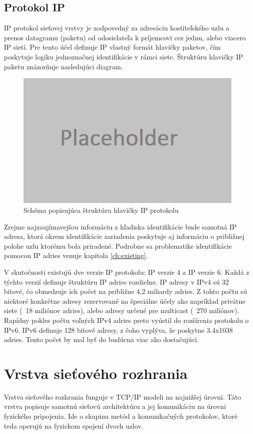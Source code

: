 \documentclass[
  printed, %
  table,   %
  lof,     %
  lot,     %
]{fithesis3}
\begin{document}
\subsection{Protokol IP}
IP protokol sieťovej vrstvy je zodpovedný za adresáciu hostiteľského uzlu a
prenos datagramu (paketu) od odosielateľa k príjemcovi cez jednu, alebo viacero
IP sietí. Pre tento účel definuje IP vlastný formát hlavičky paketov, čím
poskytuje logiku jednoznačnej identifikácie v rámci siete. Štruktúru hlavičky
IP paketu znázorňuje nasledujúci diagram.

\begin{figure}[h]
  \centering
    \includegraphics[width=.80\textwidth]{images/net-ip-head.png}
  \caption{Schéma popisujúca štruktúru hlavičky IP protokolu}
  \label{fig:net-ip-head}
\end{figure}

Zrejme najzaujímavejšou informáciu z hľadiska identifikácie bude samotná IP
adresa, ktorá okrem identifikácie zariadenia poskytuje aj informáciu o
približnej polohe uzlu ktorému bola priradené. Podrobne sa problematike
identifikácie pomocou IP adries venuje kapitola \ref{ch:existing}. 

V skutočnosti existujú dve verzie IP protokolu: IP verzie 4 a IP verzie 6.
Každá z týchto verzií definuje štruktúru IP adries rozdielne. IP adresy v IPv4
sú 32 bitové, čo obmedzuje ich počet na približne 4,2 miliardy adries. Z tohto
počtu sú niektoré konkrétne adresy rezervované na špeciálne účely ako napríklad
privátne siete (~18 miliónov adries), alebo adresy určené pre multicast
(~270 miliónov). Rapídny pokles počtu voľných IPv4 adries preto vyústil do
rozšírenia protokolu o IPv6. IPv6 definuje 128 bitové adresy, z čoho vyplýva,
že poskytne 3.4x1038 adries. Tento počet by mal byť do budúcna viac ako
dostačujúci.

\section{Vrstva sieťového rozhrania}
Vrstva sieťového rozhrania funguje v TCP/IP modeli na najnižšej úrovni.
Táto vrstva popisuje samotnú sieťovú architektúru a jej komunikáciu na úrovni
fyzického pripojenia. Ide o skupinu metód a komunikačných protokolov, ktoré 
teda operujú na fyzickom spojení dvoch uzlov.
\end{document}
